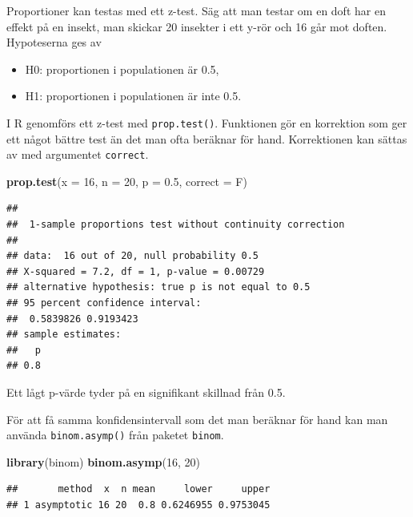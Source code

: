 \documentclass[
]{book}
\newenvironment{Shaded}{\begin{snugshade}}{\end{snugshade}}
\newcommand{\AttributeTok}[1]{\textcolor[rgb]{0.13,0.29,0.53}{#1}}
\newcommand{\DecValTok}[1]{\textcolor[rgb]{0.00,0.00,0.81}{#1}}
\newcommand{\FloatTok}[1]{\textcolor[rgb]{0.00,0.00,0.81}{#1}}
\newcommand{\FunctionTok}[1]{\textcolor[rgb]{0.13,0.29,0.53}{\textbf{#1}}}
\newcommand{\NormalTok}[1]{#1}
\providecommand{\tightlist}{%
  \setlength{\itemsep}{0pt}\setlength{\parskip}{0pt}}
\theoremstyle{definition}
\theoremstyle{definition}
\theoremstyle{definition}
\theoremstyle{definition}
\theoremstyle{remark}
\begin{document}
Proportioner kan testas med ett z-test. Säg att man testar om en doft har en effekt på en insekt, man skickar 20 insekter i ett y-rör och 16 går mot doften. Hypoteserna ges av

\begin{itemize}
\tightlist
\item
  H0: proportionen i populationen är 0.5,
\item
  H1: proportionen i populationen är inte 0.5.
\end{itemize}

I R genomförs ett z-test med \texttt{prop.test()}. Funktionen gör en korrektion som ger ett något bättre test än det man ofta beräknar för hand. Korrektionen kan sättas av med argumentet \texttt{correct}.

\begin{Shaded}
\begin{Highlighting}[]
\FunctionTok{prop.test}\NormalTok{(}\AttributeTok{x =} \DecValTok{16}\NormalTok{, }\AttributeTok{n =} \DecValTok{20}\NormalTok{, }\AttributeTok{p =} \FloatTok{0.5}\NormalTok{, }\AttributeTok{correct =}\NormalTok{ F)}
\end{Highlighting}
\end{Shaded}

\begin{verbatim}
## 
##  1-sample proportions test without continuity correction
## 
## data:  16 out of 20, null probability 0.5
## X-squared = 7.2, df = 1, p-value = 0.00729
## alternative hypothesis: true p is not equal to 0.5
## 95 percent confidence interval:
##  0.5839826 0.9193423
## sample estimates:
##   p 
## 0.8
\end{verbatim}

Ett lågt p-värde tyder på en signifikant skillnad från 0.5.

För att få samma konfidensintervall som det man beräknar för hand kan man använda \texttt{binom.asymp()} från paketet \texttt{binom}.

\begin{Shaded}
\begin{Highlighting}[]
\FunctionTok{library}\NormalTok{(binom)}
\FunctionTok{binom.asymp}\NormalTok{(}\DecValTok{16}\NormalTok{, }\DecValTok{20}\NormalTok{)}
\end{Highlighting}
\end{Shaded}

\begin{verbatim}
##       method  x  n mean     lower     upper
## 1 asymptotic 16 20  0.8 0.6246955 0.9753045
\end{verbatim}
\end{document}
